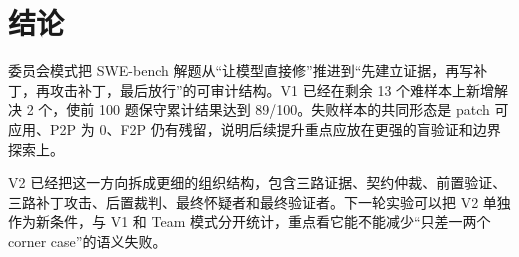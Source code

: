 \documentclass[UTF8,a4paper,11pt]{ctexart}
\begin{document}
\section{结论}

委员会模式把 SWE-bench 解题从“让模型直接修”推进到“先建立证据，再写补丁，再攻击补丁，最后放行”的可审计结构。V1 已经在剩余 13 个难样本上新增解决 2 个，使前 100 题保守累计结果达到 89/100。失败样本的共同形态是 patch 可应用、P2P 为 0、F2P 仍有残留，说明后续提升重点应放在更强的盲验证和边界探索上。

V2 已经把这一方向拆成更细的组织结构，包含三路证据、契约仲裁、前置验证、三路补丁攻击、后置裁判、最终怀疑者和最终验证者。下一轮实验可以把 V2 单独作为新条件，与 V1 和 Team 模式分开统计，重点看它能不能减少“只差一两个 corner case”的语义失败。
\end{document}
